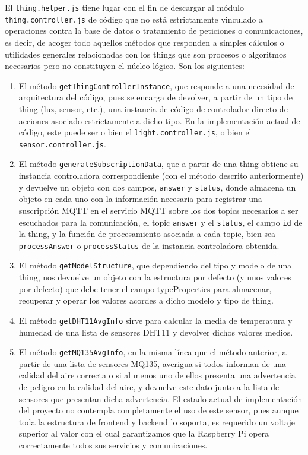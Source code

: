 El \verb|thing.helper.js| tiene lugar con el fin de descargar al módulo \verb|thing.controller.js| de código que no está estrictamente vinculado a operaciones contra la base de datos o tratamiento de peticiones o comunicaciones, es decir, de acoger todo aquellos métodos que responden a simples cálculos o utilidades generales relacionadas con los things que son procesos o algoritmos necesarios pero no constituyen el núcleo lógico. Son los siguientes:
\begin{enumerate}
\item El método \verb|getThingControllerInstance|, que responde a una necesidad de arquitectura del código, pues se encarga de devolver, a partir de un tipo de thing (luz, sensor, etc.), una instancia de código de controlador directo de acciones asociado estrictamente a dicho tipo. En la implementación actual de código, este puede ser o bien el \verb|light.controller.js|, o bien el \verb|sensor.controller.js|. 
\item El método \verb|generateSubscriptionData|, que a partir de una thing obtiene su instancia controladora correspondiente (con el método descrito anteriormente) y devuelve un objeto con dos campos, \verb|answer| y \verb|status|, donde almacena un objeto en cada uno con la información necesaria para registrar una suscripción MQTT en el servicio MQTT sobre los dos topics necesarios a ser escuchados para la comunicación, el topic \verb|answer| y el \verb|status|, el campo \verb|id| de la thing, y la función de procesamiento asociada a cada topic, bien sea \verb|processAnswer| o \verb|processStatus| de la instancia controladora obtenida.
\item El método \verb|getModelStructure|, que dependiendo del tipo y modelo de una thing, nos devuelve un objeto con la estructura por defecto (y unos valores por defecto) que debe tener el campo typeProperties para almacenar, recuperar y operar los valores acordes a dicho modelo y tipo de thing.
\item El método \verb|getDHT11AvgInfo| sirve para calcular la media de temperatura y humedad de una lista de sensores DHT11 y devolver dichos valores medios.
\item El método \verb|getMQ135AvgInfo|, en la misma línea que el método anterior, a partir de una lista de sensores MQ135, averigua si todos informan de una calidad del aire correcta o si al menos uno de ellos presenta una advertencia de peligro en la calidad del aire, y devuelve este dato junto a la lista de sensores que presentan dicha advertencia. El estado actual de implementación del proyecto no contempla completamente el uso de este sensor, pues aunque toda la estructura de frontend y backend lo soporta, es requerido un voltaje superior al valor con el cual garantizamos que la Raspberry Pi opera correctamente todos sus servicios y comunicaciones.
\end{enumerate}

